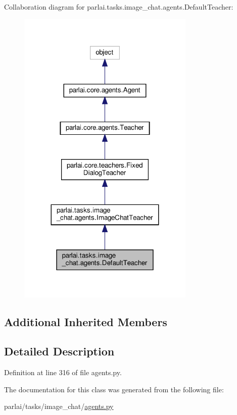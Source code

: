 Collaboration diagram for parlai.\+tasks.\+image\+\_\+chat.\+agents.\+Default\+Teacher\+:
\nopagebreak
\begin{figure}[H]
\begin{center}
\leavevmode
\includegraphics[width=239pt]{d4/d75/classparlai_1_1tasks_1_1image__chat_1_1agents_1_1DefaultTeacher__coll__graph}
\end{center}
\end{figure}
\subsection*{Additional Inherited Members}


\subsection{Detailed Description}


Definition at line 316 of file agents.\+py.



The documentation for this class was generated from the following file\+:\begin{DoxyCompactItemize}
\item 
parlai/tasks/image\+\_\+chat/\hyperlink{parlai_2tasks_2image__chat_2agents_8py}{agents.\+py}\end{DoxyCompactItemize}
